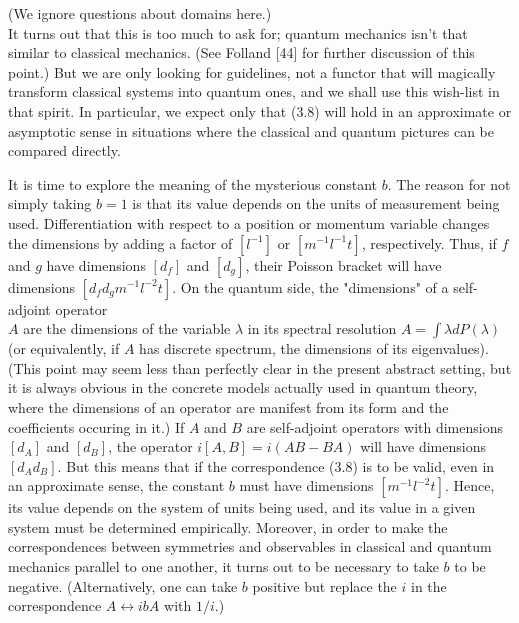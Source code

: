 \documentclass[10pt, letterpaper]{article}
\begin{document}
(We ignore questions about domains here.)\\[0pt]
It turns out that this is too much to ask for; quantum mechanics isn't that similar to classical mechanics. (See Folland [44] for further discussion of this point.) But we are only looking for guidelines, not a functor that will magically transform classical systems into quantum ones, and we shall use this wish-list in that spirit. In particular, we expect only that (3.8) will hold in an approximate or asymptotic sense in situations where the classical and quantum pictures can be compared directly.

It is time to explore the meaning of the mysterious constant $b$. The reason for not simply taking $b=1$ is that its value depends on the units of measurement being used. Differentiation with respect to a position or momentum variable changes the dimensions by adding a factor of $\left[l^{-1}\right]$ or $\left[m^{-1} l^{-1} t\right]$, respectively. Thus, if $f$ and $g$ have dimensions $\left[d_{f}\right]$ and $\left[d_{g}\right]$, their Poisson bracket will have dimensions $\left[d_{f} d_{g} m^{-1} l^{-2} t\right]$. On the quantum side, the "dimensions" of a self-adjoint operator\\
$A$ are the dimensions of the variable $\lambda$ in its spectral resolution $A=\int \lambda d P(\lambda)$ (or equivalently, if $A$ has discrete spectrum, the dimensions of its eigenvalues). (This point may seem less than perfectly clear in the present abstract setting, but it is always obvious in the concrete models actually used in quantum theory, where the dimensions of an operator are manifest from its form and the coefficients occuring in it.) If $A$ and $B$ are self-adjoint operators with dimensions $\left[d_{A}\right]$ and $\left[d_{B}\right]$, the operator $i[A, B]=i(A B-B A)$ will have dimensions $\left[d_{A} d_{B}\right]$. But this means that if the correspondence (3.8) is to be valid, even in an approximate sense, the constant $b$ must have dimensions $\left[m^{-1} l^{-2} t\right]$. Hence, its value depends on the system of units being used, and its value in a given system must be determined empirically. Moreover, in order to make the correspondences between symmetries and observables in classical and quantum mechanics parallel to one another, it turns out to be necessary to take $b$ to be negative. (Alternatively, one can take $b$ positive but replace the $i$ in the correspondence $A \leftrightarrow i b A$ with $1 / i$.)
\end{document}
